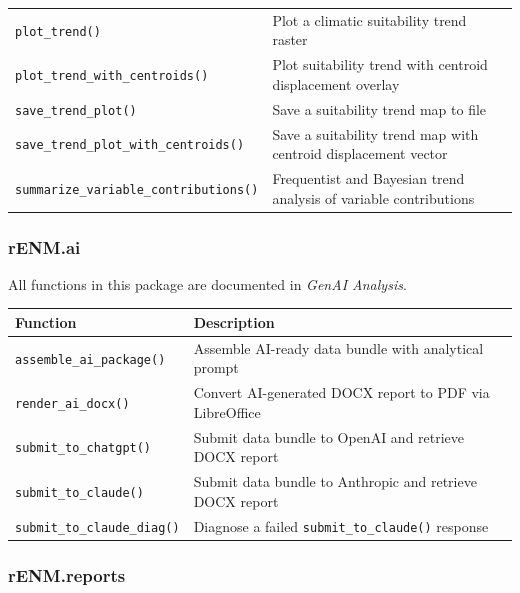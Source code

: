 \documentclass[
  letterpaper,
  DIV=11,
  numbers=noendperiod]{scrartcl}
\newcounter{none} %
\begin{document}
{\begin{longtable}[]{@{}
  >{\raggedright\arraybackslash}p{}
  >{\raggedright\arraybackslash}p{}@{}}
\texttt{plot\_trend()} & Plot a climatic suitability trend raster \\
\texttt{plot\_trend\_with\_centroids()} & Plot suitability trend with
centroid displacement overlay \\
\texttt{save\_trend\_plot()} & Save a suitability trend map to file \\
\texttt{save\_trend\_plot\_with\_centroids()} & Save a suitability trend
map with centroid displacement vector \\
\texttt{summarize\_variable\_contributions()} & Frequentist and Bayesian
trend analysis of variable contributions \\
\end{longtable}
}

\subsubsection{rENM.ai}\label{renm.ai}

All functions in this package are documented in \emph{GenAI Analysis}.

{\def\LTcaptype{none} %
\begin{longtable}[]{@{}
  >{\raggedright\arraybackslash}p{}
  >{\raggedright\arraybackslash}p{}@{}}
\toprule\noalign{}
\begin{minipage}[b]{\linewidth}\raggedright
Function
\end{minipage} & \begin{minipage}[b]{\linewidth}\raggedright
Description
\end{minipage} \\
\midrule\noalign{}
\endhead
\bottomrule\noalign{}
\endlastfoot
\texttt{assemble\_ai\_package()} & Assemble AI-ready data bundle with
analytical prompt \\
\texttt{render\_ai\_docx()} & Convert AI-generated DOCX report to PDF
via LibreOffice \\
\texttt{submit\_to\_chatgpt()} & Submit data bundle to OpenAI and
retrieve DOCX report \\
\texttt{submit\_to\_claude()} & Submit data bundle to Anthropic and
retrieve DOCX report \\
\texttt{submit\_to\_claude\_diag()} & Diagnose a failed
\texttt{submit\_to\_claude()} response \\
\end{longtable}
}

\subsubsection{rENM.reports}\label{renm.reports}
\end{document}
